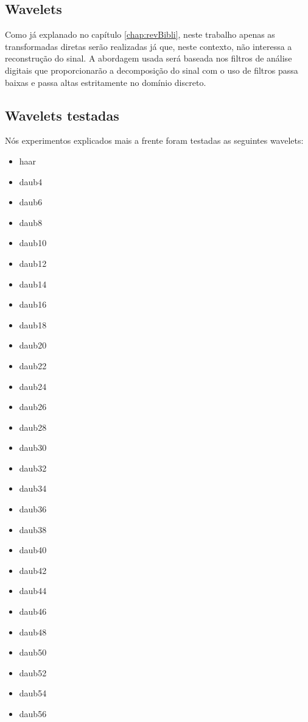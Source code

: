 \begin{myenv}{1.5}
		\section{Wavelets}
			\par Como já explanado no capítulo \ref{chap:revBibli}, neste trabalho apenas as transformadas diretas serão realizadas já que, neste contexto, não interessa a reconstrução do sinal. A abordagem usada será baseada nos filtros de análise digitais que proporcionarão a decomposição do sinal com o uso de filtros passa baixas e passa altas estritamente no domínio discreto.

			\subsection{Wavelets testadas}
				\par Nós experimentos explicados mais a  frente foram testadas as seguintes wavelets:
				\begin{multicols}{5}
					\begin{itemize}
						\item haar		\item daub4		\item daub6		\item daub8
						\item daub10	\item daub12	\item daub14	\item daub16
						\item daub18	\item daub20	\item daub22	\item daub24
						\item daub26	\item daub28	\item daub30	\item daub32
						\item daub34	\item daub36	\item daub38	\item daub40
						\item daub42	\item daub44	\item daub46	\item daub48
						\item daub50	\item daub52	\item daub54	\item daub56

\end{itemize}
\end{multicols}
\end{myenv}
